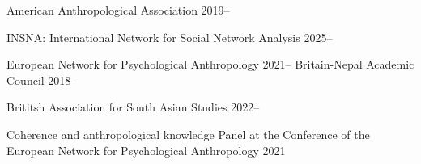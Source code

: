 


\begin{cvmemberships}
  \cvmembership
    {American Anthropological Association} %
    {2019--} %

  \cvmembership
    {INSNA: International Network for Social Network Analysis} %
    {2025--} %

  \cvmembership
    {European Network for Psychological Anthropology} %
    {2021--} %
  \cvmembership
    {Britain-Nepal Academic Council} %
    {2018--} %

  \cvmembership
    {Brititsh Association for South Asian Studies} %
    {2022--} %
\end{cvmemberships}


\begin{cvexperiences}

  \cvexperience
    {Coherence and anthropological knowledge} %
    {Panel at the Conference of the European Network for Psychological Anthropology} %
    {2021} %

\end{cvexperiences}
